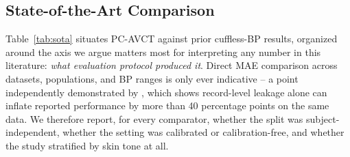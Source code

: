 \documentclass[journal]{IEEEtran}
\begin{document}
\subsection{State-of-the-Art Comparison}
\label{sec:sota}
Table~\ref{tab:sota} situates PC-AVCT against prior cuffless-BP results, organized around the axis we argue matters most for interpreting any number in this literature: \emph{what evaluation protocol produced it}. Direct MAE comparison across datasets, populations, and BP ranges is only ever indicative -- a point independently demonstrated by \cite{bpbenchmark2023}, which shows record-level leakage alone can inflate reported performance by more than 40 percentage points on the same data. We therefore report, for every comparator, whether the split was subject-independent, whether the setting was calibrated or calibration-free, and whether the study stratified by skin tone at all.
\end{document}

